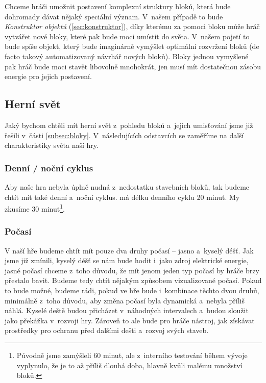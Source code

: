 Chceme hráči umožnit postavení komplexní struktury bloků, která bude dohromady dávat nějaký speciální význam. V~našem případě to bude \textit{Konstruktor objektů} (\ref{sec:konstruktor}), díky kterému za pomoci bloku  může hráč vytvářet nové bloky, které pak bude moci umístit do světa. V~našem pojetí to bude spíše objekt, který bude imaginárně vymýšlet optimální rozvržení bloků (de facto takový automatizovaný návrhář nových bloků). Bloky jednou vymyšlené pak hráč bude moci stavět libovolně mnohokrát, jen musí mít dostatečnou zásobu energie pro jejich postavení.

\subsection{Herní svět}

Jaký bychom chtěli mít herní svět z~pohledu bloků a~jejich umisťování jsme již řešili v~části \ref{subsec:bloky}. V~následujících odstavcích se zaměříme na další charakteristiky světa naší hry.

\subsubsection{Denní / noční cyklus}
Aby naše hra nebyla úplně nudná z~nedostatku stavebních bloků, tak budeme chtít mít také denní a~noční cyklus. \MC{} má délku denního cyklu 20 minut. My zkusíme 30 minut\footnote{Původně jsme zamýšleli 60 minut, ale z~interního testování během vývoje vyplynulo, že je to až příliš dlouhá doba, hlavně kvůli malému množství bloků.}.

\subsubsection{Počasí}
\label{subsubsec:weather}

V naší hře budeme chtít mít pouze dva druhy počasí -- jasno a~kyselý déšť. Jak jsme již zmínili, kyselý déšť se nám bude hodit i~jako zdroj elektrické energie, jasné počasí chceme z~toho důvodu, že mít jenom jeden typ počasí by hráče brzy přestalo bavit. Budeme tedy chtít nějakým způsobem vizualizované počasí. Pokud to bude možné, budeme rádi, pokud ve hře bude i~kombinace těchto dvou druhů, minimálně z~toho důvodu, aby změna počasí byla dynamická a~nebyla příliš náhlá. Kyselé deště budou přicházet v~náhodných intervalech a~budou sloužit jako překážka v~rozvoji hry. Zároveň to ale bude pro hráče nástroj, jak získávat prostředky pro ochranu před dalšími dešti a~rozvoj svých staveb. 

